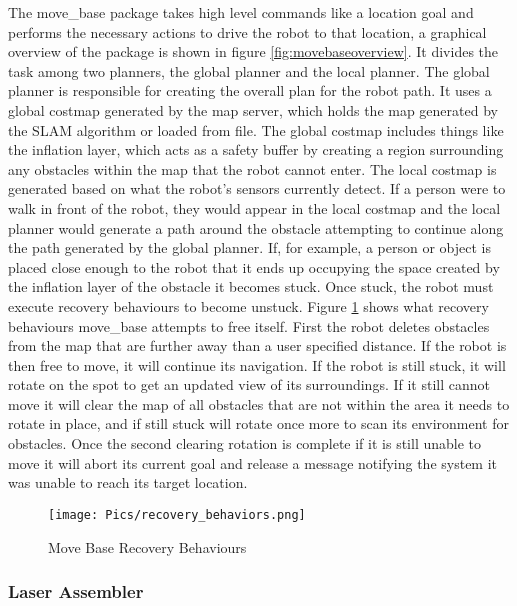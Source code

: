 The move\_base package takes high level commands like a location goal and performs the necessary actions to drive the robot to that location, a graphical overview of the package is shown in figure \ref{fig:movebaseoverview}. It divides the task among two planners, the global planner and the local planner. The global planner is responsible for creating the overall plan for the robot path. It uses a global costmap generated by the map server, which holds the map generated by the SLAM algorithm or loaded from file. The global costmap includes things like the inflation layer, which acts as a safety buffer by creating a region surrounding any obstacles within the map that the robot cannot enter. The local costmap is generated based on what the robot's sensors currently detect. If a person were to walk in front of the robot, they would appear in the local costmap and the local planner would generate a path around the obstacle attempting to continue along the path generated by the global planner. If, for example, a person or object is placed close enough to the robot that it ends up occupying the space created by the inflation layer of the obstacle it becomes stuck. Once stuck, the robot must execute recovery behaviours to become unstuck. Figure \ref{fig:recovery} shows what recovery behaviours move\_base attempts to free itself. First the robot deletes obstacles from the map that are further away than a user specified distance. If the robot is then free to move, it will continue its navigation. If the robot is still stuck, it will rotate on the spot to get an updated view of its surroundings. If it still cannot move it will clear the map of all obstacles that are not within the area it needs to rotate in place, and if still stuck will rotate once more to scan its environment for obstacles. Once the second clearing rotation is complete if it is still unable to move it will abort its current goal and release a message notifying the system it was unable to reach its target location.\\

\begin{figure}[H]
    \centering
    \texttt{[image: Pics/recovery\_behaviors.png]}
    \caption{Move Base Recovery Behaviours \cite{rosmovebase}}
    \label{fig:recovery}
\end{figure}

\subsubsection{Laser Assembler}


